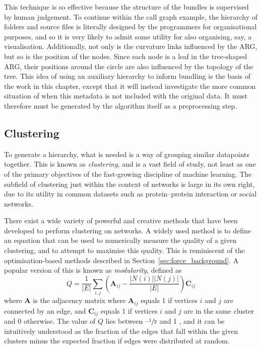 This technique is so effective because the structure of the bundles is supervised by human judgement. To continue within the call graph example, the hierarchy of folders and source files is literally designed by the programmers for organisational purposes, and so it is very likely to admit some utility for also organising, say, a visualisation.
Additionally, not only is the curvature links influenced by the ARG, but so is the position of the nodes. Since each node is a leaf in the tree-shaped ARG, their positions around the circle are also influenced by the topology of the tree.
This idea of using an auxiliary hierarchy to inform bundling is the basis of the work in this chapter, except that it will instead investigate the more common situation of when this metadata is not included with the original data. It must therefore must be generated by the algorithm itself as a preprocessing step.

\subsection{Clustering}
\label{sec:clustering_background}
To generate a hierarchy, what is needed is a way of grouping similar datapoints together. This is known as \textit{clustering}, and is a vast field of study, not least as one of the primary objectives of the fast-growing discipline of machine learning. The subfield of clustering just within the context of networks is large in its own right, due to its utility in common datasets such as protein--protein interaction or social networks.

There exist a wide variety of powerful and creative methods that have been developed to perform clustering on networks. A widely used method is to define an equation that can be used to numerically measure the quality of a given clustering, and to attempt to maximise this quality. This is reminiscent of the optimisation-based methods described in Section~\ref{sec:force_background}.
A popular version of this is known as \emph{modularity}, defined as
\begin{equation}
  Q = \frac{1}{|E|}\sum_{i,j}\left(\mathbf{A}_{ij} - \frac{|N(i)||N(j)|}{|E|}\right)\mathbf{C}_{ij}
  \label{eq:modularity}
\end{equation}
where $\mathbf{A}$ is the adjacency matrix where $\mathbf{A}_{ij}$ equals 1 if vertices $i$ and $j$ are connected by an edge, and $\mathbf{C}_{ij}$ equals 1 if vertices $i$ and $j$ are in the same cluster and 0 otherwise.
The value of $Q$ lies between $\text{--}\sfrac{1}{2}$ and 1 \cite{Brandes2007Modularity}, and it can be intuitively understood as the fraction of the edges that fall within the given clusters minus the expected fraction if edges were distributed at random.

